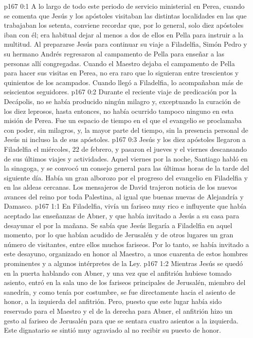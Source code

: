 \author{Comisión de seres intermedios}
\vs p167 0:1 A lo largo de todo este periodo de servicio ministerial en Perea, cuando se comenta que Jesús y los apóstoles visitaban las distintas localidades en las que trabajaban los setenta, conviene recordar que, por lo general, solo diez apóstoles iban con él; era habitual dejar al menos a dos de ellos en Pella para instruir a la multitud. Al prepararse Jesús para continuar su viaje a Filadelfia, Simón Pedro y su hermano Andrés regresaron al campamento de Pella para enseñar a las personas allí congregadas. Cuando el Maestro dejaba el campamento de Pella para hacer sus visitas en Perea, no era raro que lo siguieran entre trescientos y quinientos de los acampados. Cuando llegó a Filadelfia, lo acompañaban más de seiscientos seguidores.
\vs p167 0:2 Durante el reciente viaje de predicación por la Decápolis, no se había producido ningún milagro y, exceptuando la curación de los diez leprosos, hasta entonces, no había ocurrido tampoco ninguno en esta misión de Perea. Fue un espacio de tiempo en el que el evangelio se proclamaba con poder, sin milagros, y, la mayor parte del tiempo, sin la presencia personal de Jesús ni incluso la de sus apóstoles.
\vs p167 0:3 \pc Jesús y los diez apóstoles llegaron a Filadelfia el miércoles, 22 de febrero, y pasaron el jueves y el viernes descansando de sus últimos viajes y actividades. Aquel viernes por la noche, Santiago habló en la sinagoga, y se convocó un consejo general para las últimas horas de la tarde del siguiente día. Había un gran alborozo por el progreso del evangelio en Filadelfia y en las aldeas cercanas. Los mensajeros de David trajeron noticia de los nuevos avances del reino por toda Palestina, al igual que buenas nuevas de Alejandría y Damasco.
\vs p167 1:1 En Filadelfia, vivía un fariseo muy rico e influyente que había aceptado las enseñanzas de Abner, y que había invitado a Jesús a su casa para desayunar el  por la mañana. Se sabía que Jesús llegaría a Filadelfia en aquel momento, por lo que habían acudido de Jerusalén y de otros lugares un gran número de visitantes, entre ellos muchos fariseos. Por lo tanto, se había invitado a este desayuno, organizado en honor al Maestro, a unos cuarenta de estos hombres prominentes y a algunos intérpretes de la Ley.
\vs p167 1:2 Mientras Jesús se quedó en la puerta hablando con Abner, y una vez que el anfitrión hubiese tomado asiento, entró en la sala uno de los fariseos principales de Jerusalén, miembro del sanedrín, y como tenía por costumbre, se fue directamente hacia el asiento de honor, a la izquierda del anfitrión. Pero, puesto que este lugar había sido reservado para el Maestro y el de la derecha para Abner, el anfitrión hizo un gesto al fariseo de Jerusalén para que se sentara cuatro asientos a la izquierda. Este dignatario se sintió muy agraviado al no recibir su puesto de honor.
